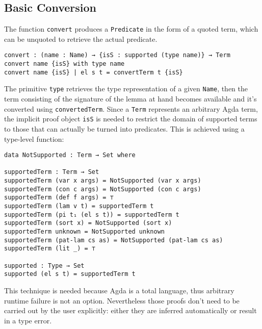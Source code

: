 \documentclass[10pt,a4paper]{article}
\begin{document}
\subsection{Basic Conversion}
The function \texttt{convert} produces a \texttt{Predicate} in the form of a quoted term, which can be unquoted to retrieve the actual predicate.
\begin{verbatim}
convert : (name : Name) → {isS : supported (type name)} → Term
convert name {isS} with type name
convert name {isS} | el s t = convertTerm t {isS}
\end{verbatim}
The primitive \texttt{type} retrieves the type representation of a given \texttt{Name}, then the term consisting of the signature of the lemma at hand becomes available and it's converted using \texttt{convertedTerm}.
Since a \texttt{Term} represents an arbitrary Agda term, the implicit proof object \texttt{isS} is needed to restrict the domain of supported terms to those that can actually be turned into predicates. This is achieved using a type-level function:
\begin{verbatim}
data NotSupported : Term → Set where

supportedTerm : Term → Set
supportedTerm (var x args) = NotSupported (var x args)
supportedTerm (con c args) = NotSupported (con c args)
supportedTerm (def f args) = ⊤
supportedTerm (lam v t) = supportedTerm t
supportedTerm (pi t₁ (el s t)) = supportedTerm t 
supportedTerm (sort x) = NotSupported (sort x)
supportedTerm unknown = NotSupported unknown
supportedTerm (pat-lam cs as) = NotSupported (pat-lam cs as)
supportedTerm (lit _) = ⊤

supported : Type → Set
supported (el s t) = supportedTerm t
\end{verbatim}
This technique is needed because Agda is a total language, thus arbitrary runtime failure is not an option. Nevertheless those proofs don't need to be carried out by the user explicitly: either they are inferred automatically or result in a type error.
\end{document}

